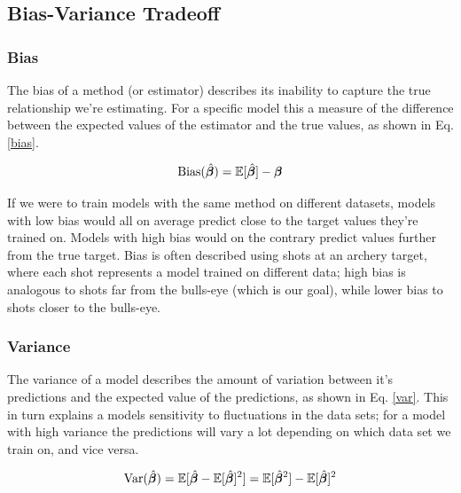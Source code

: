\subsection{Bias-Variance Tradeoff}

\subsubsection{Bias}
The bias of a method (or estimator) describes its inability to capture the true relationship we're estimating. For a specific model this a measure of the difference between the expected values of the estimator and the true values, as shown in Eq. \ref{bias}. 

\begin{equation}\label{bias}
    \text{Bias}(\hat{\boldsymbol{\beta}}) = \mathbb{E}[\hat{\boldsymbol{\beta}}]-\boldsymbol{\beta}
\end{equation}

If we were to train models with the same method on different datasets, models with low bias would all on average predict close to the target values they're trained on. Models with high bias would on the contrary predict values further from the true target. Bias is often described using shots at an archery target, where each shot represents a model trained on different data; high bias is analogous to shots far from the bulls-eye (which is our goal), while lower bias to shots closer to the bulls-eye.

\subsubsection{Variance}

The variance of a model describes the amount of variation between it's predictions and the expected value of the predictions, as shown in Eq. \ref{var}. This in turn explains a models sensitivity to fluctuations in the data sets; for a model with high variance the predictions will vary a lot depending on which data set we train on, and vice versa.

\begin{equation}\label{var}
    \text{Var}(\hat{\boldsymbol{\beta}}) = \mathbb{E}[\hat{\boldsymbol{\beta}}-\mathbb{E}[\hat{\boldsymbol{\beta}}]^2] = \mathbb{E}[\hat{\boldsymbol{\beta}}^2] - \mathbb{E}[\hat{\boldsymbol{\beta}}]^2
\end{equation}


